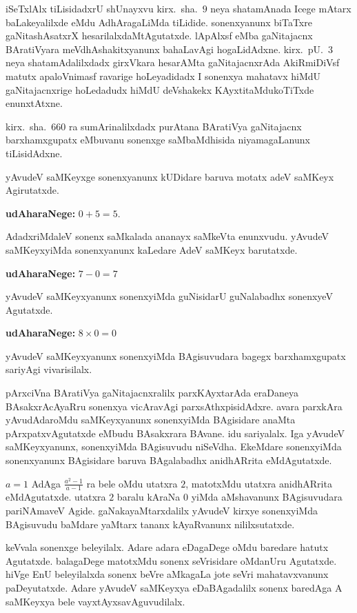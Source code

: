 iSeTxlAlx tiLisidadxrU shUnayxvu kirx.~sha.\ $9$ neya shatamAnada Icege mAtarx baLakeyalilxde eMdu AdhAragaLiMda tiLidide. sonenxyanunx biTaTxre gaNitashAsatxrX hesarilalx\-daMtAgutatxde. lApAlxsf eMba gaNitajacnx BAratiVyara meVdhAshakitxyanunx bahaLavAgi hogaLidAdxne. kirx.~pU.\ $3$ neya shatamAdalilxdadx girxVkara hesarAMta gaNitajacnxrAda AkiRmiDiVsf matutx apaloVnimasf ravarige hoLeyadidadx  I sonenxya mahatavx hiMdU \-gaNitajacnxrige hoLedadudx hiMdU deVshakekx KAyxtitaMdukoTiTxde enunxtAtxne.

kirx.~sha.\ $660$ ra sumArinalilxdadx purAtana BAratiVya gaNitajacnx barxhamxgupatx eMbuvanu sonenxge saMbaMdhisida niyamagaLanunx tiLisidAdxne.

yAvudeV saMKeyxge sonenxyanunx kUDidare baruva motatx adeV saMKeyx Agirutatxde. 

\textbf{udAharaNege:} $0+5=5$.

AdadxriMdaleV sonenx saMkalada ananayx saMkeVta enunxvudu.
\vfill\eject
yAvudeV saMKeyxyiMda sonenxyanunx kaLedare AdeV saMKeyx barutatxde.

\textbf{udAharaNege:} $7-0=7$

yAvudeV saMKeyxyanunx sonenxyiMda guNisidarU guNalabadhx sonenxyeV Agutatxde. 

\textbf{udAharaNege:} $8\times 0 = 0$

yAvudeV saMKeyxyanunx sonenxyiMda BAgisuvudara bagegx barxhamxgupatx sariyAgi vivarisilalx.

pArxciVna BAratiVya gaNitajacnxralilx parxKAyxtarAda eraDaneya BAsakxrAcAyaRru sonenxya vicAravAgi parxsAthxpisidAdxre. avara parxkAra yAvudAdaroMdu saMKeyx\-yanunx sonenxyiMda BAgisidare anaMta pArxpatxvAgutatxde eMbudu BAsakxrara BAvane. idu sariyalalx. Iga yAvudeV saMKeyxyanunx, sonenxyiMda BAgisuvudu niSeVdha. EkeMdare sonenxyiMda sonenxyanunx BAgisidare baruva BAgalabadhx anidhARrita 
eMdAgutatxde.

$a=1$ AdAga $\frac{a^2-1}{a-1}$ ra bele oMdu utatxra $2$, matotxMdu utatxra anidhARrita eMdAgutatxde. utatxra $2$ baralu kAraNa $0$ yiMda aMshavanunx BAgisuvudara pariNA\-maveV Agide. gaNakayaMtarxdalilx yAvudeV kirxye sonenxyiMda BAgisuvudu baMdare yaMtarx tananx kAyaRvanunx nililxsutatxde.

keVvala sonenxge beleyilalx. Adare adara eDagaDege oMdu baredare hatutx Agutatxde. balagaDege matotxMdu sonenx seVrisidare oMdanUru Agutatxde. hiVge EnU beleyilalxda sonenx beVre aMkagaLa jote seVri mahatavxvanunx paDeyutatxde. Adare yAvudeV saMKeyxya eDaBAgadalilx sonenx baredAga A saMKeyxya bele vayxtAyxsavAguvudilalx. 

